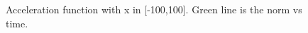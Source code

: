 \documentclass{isildur}
\begin{document}
\begin{itemize}
\begin{figure}[htbp] \centering
\mbox{}
\caption{Acceleration function with x in [-100,100]. Green line is the norm vs time.
 }
\end{figure}
\begin{figure}[htbp]
\centering
\mbox{}
\end{figure}
\end{itemize}
\end{document}

